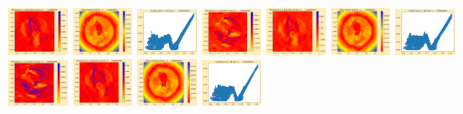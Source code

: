 \documentclass[11pt]{article}
\begin{document}
\includegraphics[width=0.11875\textwidth]{frame0073fig3.png}
\vskip 10pt 
\includegraphics[width=0.11875\textwidth]{frame0074fig0.png}
\includegraphics[width=0.11875\textwidth]{frame0074fig1.png}
\includegraphics[width=0.11875\textwidth]{frame0074fig2.png}
\includegraphics[width=0.11875\textwidth]{frame0074fig3.png}
\includegraphics[width=0.11875\textwidth]{frame0075fig0.png}
\includegraphics[width=0.11875\textwidth]{frame0075fig1.png}
\includegraphics[width=0.11875\textwidth]{frame0075fig2.png}
\includegraphics[width=0.11875\textwidth]{frame0075fig3.png}
\vskip 10pt 
\includegraphics[width=0.11875\textwidth]{frame0076fig0.png}
\includegraphics[width=0.11875\textwidth]{frame0076fig1.png}
\end{document}
